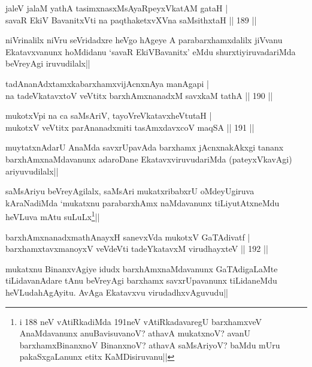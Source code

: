 
\begin{shl}
jaleV jalaM yathA tasimxnasxMsAyaRpeyxVkatAM gataH |\\
savaR EkiV BavanitxVti na paqthaketxvXVna saMsithxtaH \hfill || 189 ||
\end{shl}

\begin{artha}
niVrinalilx niVru seVridadxre heVgo hAgeye A parabarxhamxdalilx jiVvanu Ekatavxvanunx hoMdidanu `savaR EkiVBavanitx' eMdu shurxtiyiruvadariMda beVreyAgi iruvudilalx||
\end{artha}


\begin{shl}
tadAnanAdxtamxkabarxhamxvijAcnxnAya manAgapi |\\
na tadeVkatavxtoV veVtitx barxhAmx\s \s nanadxM savxkaM tathA \hfill || 190 ||
\end{shl}

\begin{shl}
mukotxV\s pi na ca saMsAriV, tayoVreVkatavxheVtutaH |\\
mukotxV veVtitx parAnanadxmiti tasAmxdavxcoV maqSA \hfill || 191 ||
\end{shl}

\begin{artha}
muytatxnAdarU AnaMda savxrUpavAda barxhamx jAcnxnakAkxgi tananx barxhAmxnaMdavanunx adaroDane EkatavxviruvudariMda (pateyxVkavAgi) ariyuvudilalx||

saMsAriyu beVreyAgilalx, saMsAri mukatxribabxrU oMdeyUgiruva kAraNadiMda `mukatxnu parabarxhAmx naMdavanunx tiLiyutAtxneMdu heVLuva mAtu suLuLx\footnote[1]{i 188 neV vAtiRkadiMda 191neV vAtiRkadavaregU barxhamxveV AnaMdavanunx anuBavisuvanoV? athavA mukatxnoV? avanU barxhamxBinanxnoV BinanxnoV? athavA saMsAriyoV? baMdu mUru pakaSxgaLanunx etitx KaMDisiruvanu||}||
\end{artha}

\begin{shl}
barxhAmxnanadxmathAnayxH sanevxVda mukotxV GaTAdivatf |\\
barxhamxtavxmanoyxV veVdeVti tadeYkatavxM virudhayxteV \hfill || 192 ||
\end{shl}

\begin{artha}%
mukatxnu BinanxvAgiye idudx barxhAmxnaMdavanunx GaTAdigaLaMte tiLidavanAdare tAnu beVreyAgi barxhamx savxrUpavanunx tiLidaneMdu heVLudahAgAyitu. AvAga Ekatavxvu virudadhxvAguvudu||
\end{artha}

